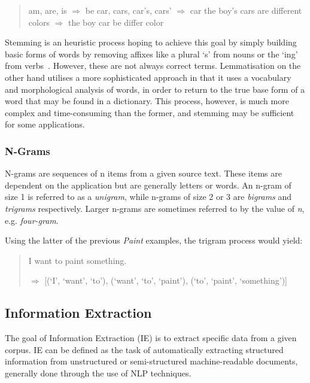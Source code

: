 \begin{quote}
am, are, is \begin{math}\Rightarrow\end{math} be 
\newline
car, cars, car's, cars' \begin{math}\Rightarrow\end{math} car
\newline
\newline
the boy's cars are different colors  \begin{math}\Rightarrow \end{math}
\newline
the boy car be differ color
\end{quote}

Stemming is an heuristic process hoping to achieve this goal by simply building basic forms of words by removing affixes like a plural `s' from nouns or the `ing' from verbs~\cite{hotho-etal-ldv-2005}. However, these are not always correct terms. Lemmatisation on the other hand utilises a more sophisticated approach in that it uses a vocabulary and morphological analysis of words, in order to return to the true base form of a word that may be found in a dictionary. This process, however, is much more complex and time-consuming than the former, and stemming may be sufficient for some applications.

\subsubsection{N-Grams}
N-grams are sequences of n items from a given source text. These items are dependent on the application but are generally letters or words. An n-gram of size 1 is referred to as a \emph{unigram}, while n-grams of size 2 or 3 are \emph{bigrams} and \emph{trigrams} respectively. Larger n-grams are sometimes referred to by the value of \emph{n}, e.g. \emph{four-gram}.

Using the latter of the previous \emph{Paint} examples, the trigram process would yield:
\begin{quote}
I want to paint something.

\begin{math}\Rightarrow\end{math}
[(`I', `want', `to'), (`want', `to', `paint'), (`to', `paint', `something')]
\end{quote}

\subsection{Information Extraction}
The goal of Information Extraction (IE) is to extract specific data from a given corpus. IE can be defined as the task of automatically extracting structured information from unstructured or semi-structured machine-readable documents, generally done through the use of NLP techniques.

